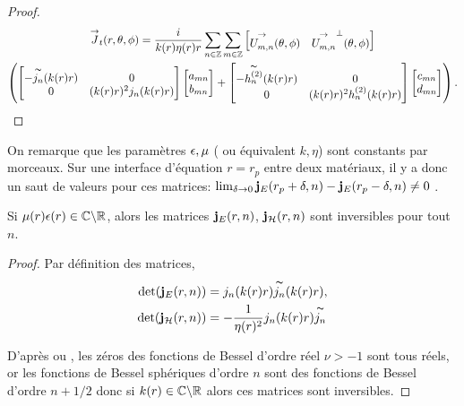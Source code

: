 \begin{proof}
\begin{multline*}
            {\overset{\rightarrow}{J}}_t(r,\theta,\phi) = \dfrac{i}{k(r)\eta(r)r}\sum_{n\in\mathbb Z}\sum_{m\in\mathbb Z}
            \begin{bmatrix}
                {\overset{\rightarrow}{U_{m,n}^{{}}}}(\theta,\phi) & {\overset{\rightarrow}{U_{m,n}^{{}}}}^\perp(\theta,\phi)
            \end{bmatrix}
            \\
            \left(
                \begin{bmatrix}
                    -\overset{\thicksim}{j_n}(k(r)r) & 0
                    \\
                    0 & (k(r)r)^2 j_n(k(r)r)
                \end{bmatrix}
                \begin{bmatrix}
                    a_{mn}
                    \\
                    b_{mn}
                \end{bmatrix}
                +
                \begin{bmatrix}
                    -\overset{\thicksim}{h^{(2)}_n}(k(r)r) & 0
                    \\                
                    0 & (k(r)r)^2 h^{(2)}_n(k(r)r)
                \end{bmatrix}
                \begin{bmatrix}
                    c_{mn}
                    \\
                    d_{mn}
                \end{bmatrix}
            \right).
        \end{multline*}
    \end{proof}

    On remarque que les paramètres \(\epsilon,\mu\) ( ou équivalent \(k,\eta\)) sont constants par morceaux.
    Sur une interface d'équation \(r=r_p\) entre deux matériaux, il y a donc un saut de valeurs pour ces matrices: \(\lim_{\delta\rightarrow 0 } \mathbf{j}_E(r_p+ \delta,n) - \mathbf{j}_E(r_p - \delta,n) \not = 0\) .

    \begin{prop}
      \label{lem:sphere:imp:inv_matrices_JE-HE}
      Si \(\mu(r)\epsilon(r) \in \mathbb C\backslash\mathbb R\), alors les matrices \(\mathbf{j}_E(r,n)\), \(\mathbf{j}_{\mathcal{H}}(r,n)\)  sont inversibles pour tout \(n\).
    \end{prop}

    \begin{proof}
      Par définition des matrices,
      \begin{align*}
        \det(\mathbf{j}_E(r,n)) &= j_n(k(r)r)\overset{\thicksim}{j_n}(k(r)r),
        \\
        \det(\mathbf{j}_{\mathcal{H}}(r,n)) &= -\dfrac{1}{\eta(r)^2}j_n(k(r)r)\overset{\thicksim}{j_n}
      \end{align*}

      D’après \cite[p.~370]{abramowitz_handbook_1964} ou \cite[\url{https://dlmf.nist.gov/10.58}]{dlmf_nist_2019}, les zéros des fonctions de Bessel d'ordre réel \(\nu >-1\) sont tous réels, or les fonctions de Bessel sphériques d'ordre \(n\) sont des fonctions de Bessel d'ordre \(n+1/2\) donc si \(k(r) \in\mathbb C\backslash\mathbb R\) alors ces matrices sont inversibles.
    \end{proof}


